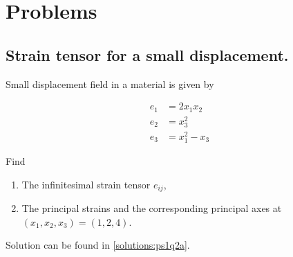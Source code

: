 % 
% 
% 
% 
% 
% 
% 
% 
% 
% 
% 
% 
\section{Problems}

\label{problem:strain:ps1q2a}
\subsection{Strain tensor for a small displacement.}

Small displacement field in a material is given by

\begin{align}\label{eqn:continuumProblemSet1:30}
e_1 &= 2 x_1 x_2 \\
e_2 &= x_3^2 \\
e_3 &= x_1^2 - x_3
\end{align}

Find

\begin{enumerate}
\item The infinitesimal strain tensor $e_{ij}$,
\item The principal strains and the corresponding principal axes at $(x_1, x_2, x_3) = (1, 2, 4)$.
\end{enumerate}

Solution can be found in \ref{solutions:ps1q2a}.
